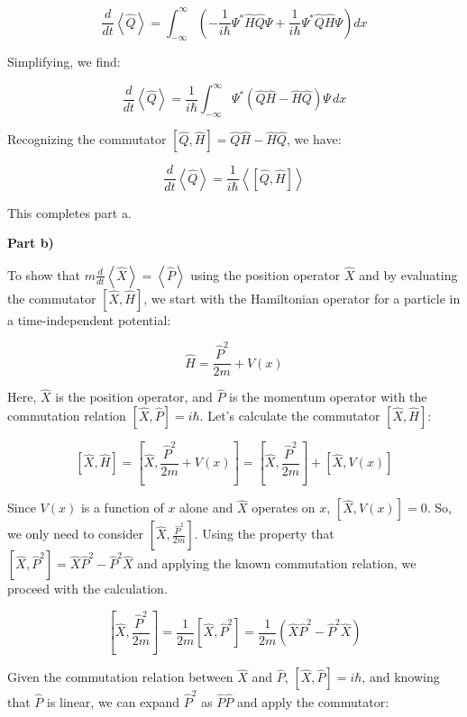 \[
\frac{d}{dt}\left<\hat{Q}\right> = \int_{-\infty}^{\infty} \left( -\frac{1}{i\hbar} \Psi^{*} \hat{H} \hat{Q} \Psi + \frac{1}{i\hbar} \Psi^{*} \hat{Q} \hat{H} \Psi \right) dx
\]

Simplifying, we find:

\[
\frac{d}{dt}\left<\hat{Q}\right> = \frac{1}{i\hbar} \int_{-\infty}^{\infty} \Psi^{*} \left( \hat{Q} \hat{H} - \hat{H} \hat{Q} \right) \Psi \, dx
\]

Recognizing the commutator \(\left[ \hat{Q}, \hat{H} \right] = \hat{Q} \hat{H} - \hat{H} \hat{Q}\), we have:

\[
\frac{d}{dt}\left<\hat{Q}\right> = \frac{1}{i\hbar}\left< \left[ \hat{Q}, \hat{H} \right] \right>
\]

This completes part a.

\textbf{Part b)}

To show that \(m\frac{d}{dt}\left<\hat{X}\right> = \left<\hat{P}\right>\) using the position operator \(\hat{X}\) and by evaluating the commutator \(\left[ \hat{X}, \hat{H}\right]\), we start with the Hamiltonian operator for a particle in a time-independent potential:

\[
\hat{H} = \frac{\hat{P}^2}{2m} + V(x)
\]

Here, \(\hat{X}\) is the position operator, and \(\hat{P}\) is the momentum operator with the commutation relation \(\left[\hat{X}, \hat{P}\right] = i\hbar\). Let's calculate the commutator \(\left[ \hat{X}, \hat{H}\right]\):

\[
\left[ \hat{X}, \hat{H}\right] = \left[ \hat{X}, \frac{\hat{P}^2}{2m} + V(x)\right] = \left[ \hat{X}, \frac{\hat{P}^2}{2m}\right] + \left[ \hat{X}, V(x)\right]
\]

Since \(V(x)\) is a function of \(x\) alone and \(\hat{X}\) operates on \(x\), \(\left[ \hat{X}, V(x)\right] = 0\). So, we only need to consider \(\left[ \hat{X}, \frac{\hat{P}^2}{2m}\right]\). Using the property that \(\left[\hat{X}, \hat{P}^2\right] = \hat{X}\hat{P}^2 - \hat{P}^2\hat{X}\) and applying the known commutation relation, we proceed with the calculation.

\[
\left[ \hat{X}, \frac{\hat{P}^2}{2m}\right] = \frac{1}{2m}\left[ \hat{X}, \hat{P}^2\right] = \frac{1}{2m}\left( \hat{X}\hat{P}^2 - \hat{P}^2\hat{X} \right)
\]

Given the commutation relation between \(\hat{X}\) and \(\hat{P}\), \(\left[ \hat{X}, \hat{P} \right] = i\hbar\), and knowing that \(\hat{P}\) is linear, we can expand \(\hat{P}^2\) as \(\hat{P}\hat{P}\) and apply the commutator:

